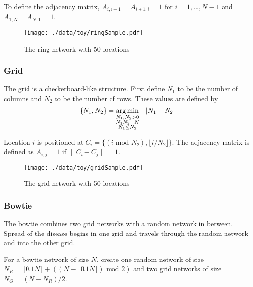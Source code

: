 \documentclass[11pt]{article}
\begin{document}
To define the adjacency matrix, $A_{i,i+1} = A_{i+1,i} = 1$ for $i =
1,\ldots,N-1$ and $A_{1,N} = A_{N,1} = 1$.



\begin{figure}[htb]
\centering
\texttt{[image: ./data/toy/ringSample.pdf]}
\caption{\label{fig:ring25}The ring network with 50 locations}
\end{figure}




\subsubsection{Grid}
\label{sec-2-1-4}

The grid is a checkerboard-like structure.  First define $N_1$ to be
the number of columns and $N_2$ to be the number of rows.  These
values are defined by
\begin{equation*}
  \lbrace N_1, N_2 \rbrace = \underset{
    \begin{subarray}{c}
      N_1,N_2 > 0\\
      N_1N_2 = N\\
      N_1 \le N_2
    \end{subarray}
  }{\arg\min} \quad |N_1 - N_2|
\end{equation*}

Location $i$ is positioned at $C_i = \lbrace (i \text{ mod } N_2), \lfloor
i/N_2 \rfloor \rbrace$.  The adjacency matrix is defined as $A_{i,j} =
1$ if $\|C_i - C_j\| = 1$.

\begin{figure}[htb]
\centering
\texttt{[image: ./data/toy/gridSample.pdf]}
\caption{\label{fig:grid25}The grid network with 50 locations}
\end{figure}



\subsubsection{Bowtie}
\label{sec-2-1-5}

The bowtie combines two grid networks with a random network in
between.  Spread of the disease begins in one grid and travels through
the random network and into the other grid.

For a bowtie network of size $N$, create one random network of size
$N_R = \lceil 0.1 N \rceil + ((N - \lceil 0.1 N \rceil) \text{ mod }
2)$ and two grid networks of size $N_G = (N - N_R)/2$.
\end{document}
